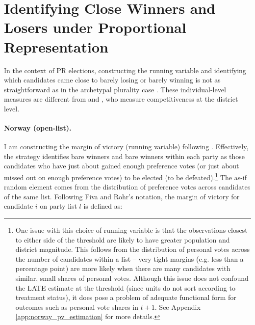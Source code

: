 \documentclass[12pt]{article}
\begin{document}
\pagebreak


\section{Identifying Close Winners and Losers under Proportional Representation}
\label{app:pr_running}

In the context of PR elections, constructing the running variable and identifying which candidates came close to barely losing or barely winning is not as straightforward as in the archetypal plurality case \citep{lee2001a,lee2008, fiva2016,fiva2018b}. These individual-level measures are different from \citet{blais2009} and \citet{cox2020}, who measure competitiveness at the district level.




\paragraph*{Norway (open-list).} I am constructing the margin of victory (running variable) following \citet{fiva2018a}. Effectively, the strategy identifies bare winners and bare winners within each party as those candidates who have just about gained enough preference votes (or just about missed out on enough preference votes) to be elected (to be defeated).\footnote{One issue with this choice of running variable is that the observations closest to either side of the threshold are likely to have greater population and district magnitude. This follows from the distribution of personal votes across the number of candidates within a list -- very tight margins (e.g. less than a percentage point) are more likely when there are many candidates with similar, small shares of personal votes. Although this issue does not confound the LATE estimate at the threshold (since units do not sort according to treatment status), it does pose a problem of adequate functional form for outcomes such as personal vote shares in $t+1$. See Appendix \ref{app:norway_pv_estimation} for more details.} The as-if random element comes from the distribution of preference votes across candidates of the same list. Following Fiva and Rohr's notation, the margin of victory for candidate $i$ on party list $l$ is defined as:
\end{document}
